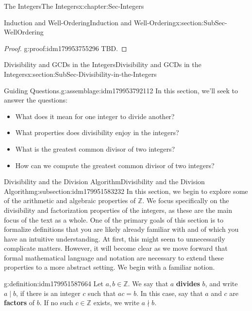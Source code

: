 \documentclass[oneside,10pt,]{book}
\newcommand{\terminology}[1]{\textbf{#1}}
\numberwithin{equation}{section}
\def\Z{{\mathbb Z}}
\begin{document}
\begin{chapterptx}{The Integers}{}{The Integers}{}{}{x:chapter:Sec-Integers}
\begin{sectionptx}{Induction and Well-Ordering}{}{Induction and Well-Ordering}{}{}{x:section:SubSec-WellOrdering}
\begin{proof}{}{g:proof:idm179953755296}
TBD.\end{proof}
\end{sectionptx}
%
%
\typeout{************************************************}
\typeout{************************************************}
%
\begin{sectionptx}{Divisibility and GCDs in the Integers}{}{Divisibility and GCDs in the Integers}{}{}{x:section:SubSec-Divisibility-in-the-Integers}
\begin{assemblage}{Guiding Questions.}{g:assemblage:idm179953792112}%
In this section, we'll seek to answer the questions: %
\begin{itemize}[label=\textbullet]
\item{}What does it mean for one integer to divide another?%
\item{}What properties does divisibility enjoy in the integers?%
\item{}What is the greatest common divisor of two integers?%
\item{}How can we compute the greatest common divisor of two integers?%
\end{itemize}
%
\end{assemblage}
%
%
\typeout{************************************************}
\typeout{************************************************}
%
\begin{subsectionptx}{Divisibility and the Division Algorithm}{}{Divisibility and the Division Algorithm}{}{}{g:subsection:idm179951583232}
In this section, we begin to explore some of the arithmetic and algebraic properties of \(\Z\). We focus specifically on the divisibility and factorization properties of the integers, as these are the main focus of the text as a whole. One of the primary goals of this section is to formalize definitions that you are likely already familiar with and of which you have an intuitive understanding. At first, this might seem to unnecessarily complicate matters. However, it will become clear as we move forward that formal mathematical language and notation are necessary to extend these properties to a more abstract setting. We begin with a familiar notion.%
\begin{definition}{}{g:definition:idm179951587664}%
%
%
Let \(a,b\in \Z\). We say that \(a\) \terminology{divides} \(b\), and write \(a\mid b\), if there is an integer \(c\) such that \(ac = b\). In this case, say that \(a\) and \(c\) are \terminology{factors} of \(b\). If no such \(c\in \Z\) exists, we write \(a\nmid b\).%

\end{definition}
\end{subsectionptx}
\end{sectionptx}
\end{chapterptx}
\end{document}
